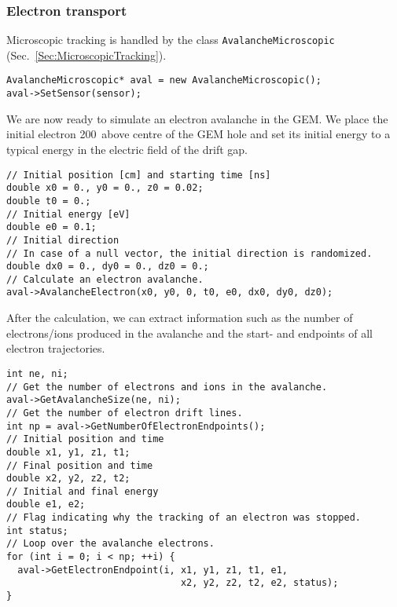 \subsubsection{Electron transport}
Microscopic tracking is handled by the class 
\texttt{AvalancheMicroscopic} (Sec.~\ref{Sec:MicroscopicTracking}).
\begin{lstlisting}
AvalancheMicroscopic* aval = new AvalancheMicroscopic();
aval->SetSensor(sensor);
\end{lstlisting}
We are now ready to simulate an electron avalanche in the GEM.
We place the initial electron 200\, above centre of the GEM hole 
and set its initial energy to a typical energy in the electric field 
of the drift gap.
\begin{lstlisting}
// Initial position [cm] and starting time [ns]
double x0 = 0., y0 = 0., z0 = 0.02;
double t0 = 0.;
// Initial energy [eV]
double e0 = 0.1;
// Initial direction 
// In case of a null vector, the initial direction is randomized.
double dx0 = 0., dy0 = 0., dz0 = 0.;
// Calculate an electron avalanche.
aval->AvalancheElectron(x0, y0, 0, t0, e0, dx0, dy0, dz0);
\end{lstlisting}
After the calculation, we can extract information such as
the number of electrons/ions produced in the avalanche
and the start- and endpoints of all electron trajectories. 
\begin{lstlisting}
int ne, ni;
// Get the number of electrons and ions in the avalanche.
aval->GetAvalancheSize(ne, ni);
// Get the number of electron drift lines.
int np = aval->GetNumberOfElectronEndpoints();
// Initial position and time
double x1, y1, z1, t1;
// Final position and time
double x2, y2, z2, t2;
// Initial and final energy
double e1, e2;
// Flag indicating why the tracking of an electron was stopped.
int status;
// Loop over the avalanche electrons.
for (int i = 0; i < np; ++i) {
  aval->GetElectronEndpoint(i, x1, y1, z1, t1, e1,
                               x2, y2, z2, t2, e2, status);
} 
\end{lstlisting}
